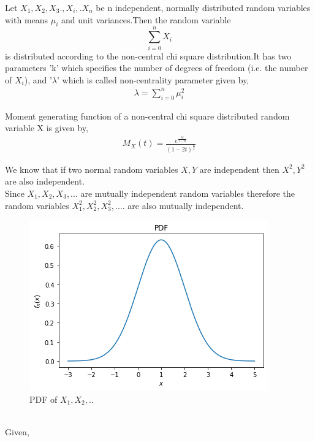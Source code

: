 \documentclass[journal,12pt,twocolumn]{IEEEtran}
\begin{document}
\begin{definition}
Let $X_{1},X_{2},X_{3}.,X_{i},.X_{n}$ be n independent, normally distributed random variables with means $\mu_{i}$ and unit variances.Then the random variable
$$\sum_{i=0}^{n}X_{i}$$ is distributed according to the non-central chi square distribution.It has two parameters 'k' which specifies the number of degrees of freedom (i.e. the number of $X_{i}$), and '$\lambda$' which is called non-centrality parameter given by,
\begin{align}
    \lambda=\sum_{i=0}^{n}\mu_{i}^2
\end{align}
\label{def-NCSD}
\end{definition}
\begin{lemma}
Moment generating function of a non-central chi square distributed random variable X is given by,
\begin{align}
    M_{X}(t)=\frac{e^{\frac{\lambda t}{1-2t}}}{(1-2t)^{\frac{n}{2}}}
\end{align}
\label{MGF}
\end{lemma}
We know that if two normal random variables $X,Y$ are independent then $X^2,Y^2$ are also independent.
\\Since $X_{1},X_{2},X_{3},...$ are mutually independent random variables therefore the random variables $X_{1}^{2},X_{2}^{2},X_{3}^{2},....$  are also mutually independent.
\begin{figure}[h]
 \centering
\includegraphics[width=\columnwidth]{PDF.png}
 \caption{PDF of $X_{1},X_{2},..$}
    \label{fig:my_label}
\end{figure}
\\Given,
\end{document}
